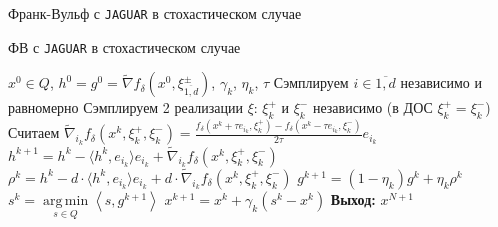 \documentclass{beamer}
\DeclareMathOperator*{\argmin}{arg\,min}
\begin{document}

\begin{frame}{Франк-Вульф с \texttt{JAGUAR} в стохастическом случае}

    \begin{algorithm}[H]
        \caption{ФВ с \texttt{JAGUAR} в стохастическом случае}
        \begin{algorithmic}
         $x^0 \in Q$, $h^0 = g^0 = \widetilde{\nabla} f_\delta (x^0, \xi_{\overline{1, d}}^\pm)$, $\gamma_k$, $\eta_k$, $\tau$
            \State Сэмплируем $i \in \overline{1, d}$ независимо и равномерно
            \State Сэмплируем 2 реализации $\xi$: $\xi^+_k$ и $\xi^-_k$ независимо (в ДОС $\xi_k^+= \xi_k^-$)
            \State Считаем $\widetilde{\nabla}_{i_k} f_\delta (x^k, \xi^+_k, \xi^-_k) = \frac{f_\delta (x^k + \tau e_{i_k}, \xi^+_k) - f_\delta (x^k - \tau e_{i_k}, \xi^-_k)}{2 \tau} e_{i_k}$
            \State $h^{k+1} = h^k - \langle h^k, e_{i_k} \rangle e_{i_k} + \widetilde{\nabla}_{i_k} f_\delta (x^k, \xi^+_k, \xi^-_k)$
            \State $\rho^{k} = h^{k} - d \cdot \langle h^{k}, e_{i_k} \rangle e_{i_k} + d \cdot \widetilde{\nabla}_{i_k} f_\delta (x^k, \xi^+_k, \xi^-_k)$
            \State $g^{k + 1} = (1 - \eta_k) g^k + \eta_k \rho^k$
            \State $s^k = \argmin\limits_{s \in Q} \left<s, g^{k+1} \right>$
            \State $x^{k + 1} = x^k + \gamma_k (s^k - x^k)$
        \EndFor
        \State \textbf{Выход:} $x^{N + 1}$
        \end{algorithmic}
   \end{algorithm}
  
\end{frame}

\end{document}
